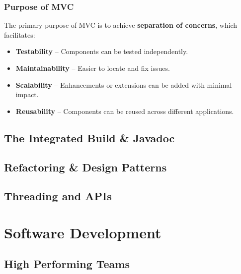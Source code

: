 \documentclass{article}
\begin{document}
\subsubsection{Purpose of MVC}

The primary purpose of MVC is to achieve \textbf{separation of concerns}, which facilitates:
\begin{itemize}
    \item \textbf{Testability} – Components can be tested independently.
    \item \textbf{Maintainability} – Easier to locate and fix issues.
    \item \textbf{Scalability} – Enhancements or extensions can be added with minimal impact.
    \item \textbf{Reusability} – Components can be reused across different applications.
\end{itemize}


 
















\subsection{The Integrated Build \& Javadoc}

\subsection{Refactoring \& Design Patterns}

\subsection{Threading and APIs}

\newpage
\section{Software Development}

\subsection{High Performing Teams}
\end{document}
